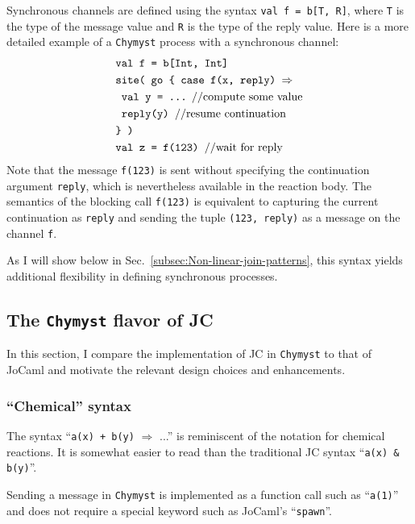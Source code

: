 \documentclass[sigplan,10pt,review,anonymous]{acmart}\settopmatter{printfolios=true}
\begin{document}
Synchronous channels are defined using the syntax \texttt{val f =
b{[}T, R{]}}, where \texttt{T} is the type of the message value and
\texttt{R} is the type of the reply value. Here is a more detailed
example of a \texttt{Chymyst} process with a synchronous channel:
\begin{align*}
\text{} & \text{\texttt{val f = b[Int, Int]}}\\
 & \text{\texttt{site( go \{ case f(x, reply) \ensuremath{\Rightarrow}}}\\
 & \text{\text{\texttt{  val y = ...} //compute some value}}\\
 & \text{\texttt{  reply(y) }//resume continuation}\\
 & \text{\texttt{\} )}}\\
 & \text{\texttt{val z = f(123) }//wait for reply}
\end{align*}
Note that the message \texttt{f(123)} is sent without specifying the
continuation argument \texttt{reply}, which is nevertheless available
in the reaction body. The semantics of the blocking call \texttt{f(123)}
is equivalent to capturing the current continuation as \texttt{reply}
and sending the tuple \texttt{(123, reply)} as a message on the channel
\texttt{f}.

As I will show below in Sec.~\ref{subsec:Non-linear-join-patterns},
this syntax yields additional flexibility in defining
synchronous processes.

\subsection{The \texttt{Chymyst} flavor of JC}

In this section, I compare the implementation of JC in \texttt{Chymyst}
to that of JoCaml and motivate the relevant design choices and enhancements.

\subsubsection{``Chemical'' syntax}

The syntax ``\texttt{a(x) + b(y)} $\Rightarrow$ ...'' is reminiscent
of the notation for chemical reactions. It is somewhat easier to read
than the traditional JC syntax ``\texttt{a(x) \& b(y)}''.

Sending a message in \texttt{Chymyst} is implemented as a function
call such as ``\texttt{a(1)}'' and does not require a special keyword
such as JoCaml's ``\texttt{spawn}''.
\end{document}
